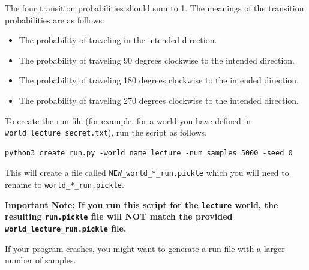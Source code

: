 \documentclass[12pt]{article}
\begin{document}
The four transition probabilities should sum to 1. The meanings of the transition probabilities are as follows:
\begin{itemize}
\item The probability of traveling in the intended direction.
\item The probability of traveling 90 degrees clockwise to the intended direction.
\item The probability of traveling 180 degrees clockwise to the intended direction.
\item The probability of traveling 270 degrees clockwise to the intended direction.
\end{itemize}


To create the run file (for example, for a world you have defined in \verb+world_lecture_secret.txt+), run the script as follows.
%
\begin{verbatim}
python3 create_run.py -world_name lecture -num_samples 5000 -seed 0
\end{verbatim}
%

This will create a file called \verb+NEW_world_*_run.pickle+ which you will need to rename to \verb+world_*_run.pickle+. 

{\bf Important Note: If you run this script for the \verb+lecture+ world, the resulting \verb+run.pickle+ file will NOT match the provided \verb+world_lecture_run.pickle+ file.}

If your program crashes, you might want to generate a run file with a larger number of samples.

 
\end{document}
